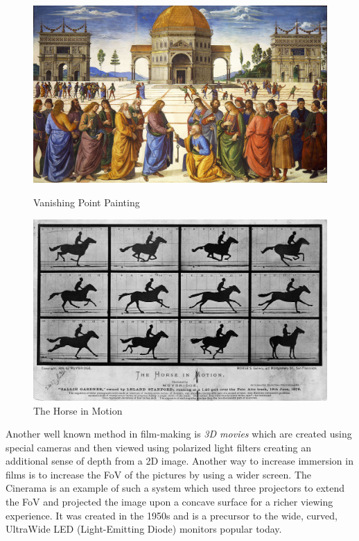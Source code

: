 \begin{figure}[!htb]
  \includegraphics[width=\linewidth]{img/perugino.jpg}
  \caption{Vanishing Point Painting \cite{FileEntr24online}}\label{fig:san-pedro}
\endminipage\hfill
{}
  \includegraphics[width=\linewidth]{img/horse-in-mot.jpg}
  \caption{The Horse in Motion \cite{FileTheH64online}}\label{fig:horse-motion}
\endminipage
\end{figure}

Another well known method in film-making is \textit{3D movies} which are created using special cameras and then viewed using polarized light filters creating an additional sense of depth from a 2D image. Another way to increase immersion in films is to increase the FoV of the pictures by using a wider screen. The Cinerama is an example of such a system which used three projectors to extend the FoV and projected the image upon a concave surface for a richer viewing experience. It was created in the 1950s and is a precursor to the wide, curved, UltraWide LED (Light-Emitting Diode) monitors popular today. 

